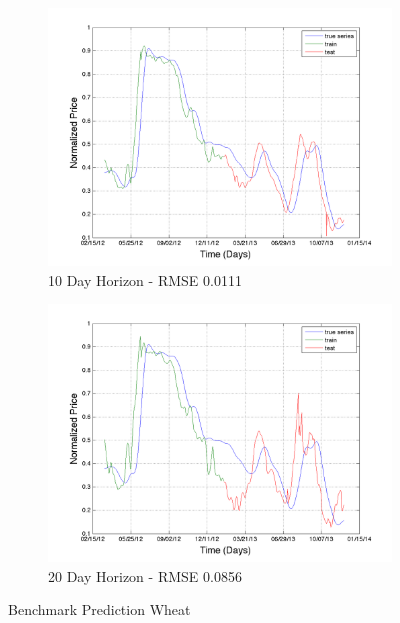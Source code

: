 \begin{figure}
       \hfill
       
        \begin{subfigure}[b]{0.5\textwidth}
                \includegraphics[width=\textwidth]{img/model/wheat/pred_14}
                \caption{10 Day Horizon - RMSE 0.0111}
                \label{fig:mouse}
        \end{subfigure}%
         \begin{subfigure}[b]{0.5\textwidth}
                \includegraphics[width=\textwidth]{img/model/wheat/pred_20}
                \caption{20 Day Horizon - RMSE 0.0856}
                \label{fig:mouse}
        \end{subfigure}
        \caption{Benchmark Prediction Wheat}\label{fig:animals}
\end{figure}





